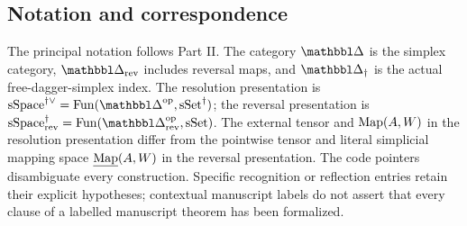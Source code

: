 \subsection*{Notation and correspondence}

The principal notation follows Part II.
The category $\prism$ is the simplex category,
$\prism_{\rev}$ includes reversal maps,
and $\prism_{\dag}$ is the actual free-dagger-simplex index.
The resolution presentation is
$\sSpace^{\dag\vee}=\Fun(\prism^{\mathrm{op}},\sSet^{\dag})$;
the reversal presentation is
$\sSpace^{\dag}_{\rev}=\Fun(\prism_{\rev}^{\mathrm{op}},\sSet)$.
The external tensor and $\operatorname{Map}(A,W)$ in the resolution presentation differ from
the pointwise tensor and literal simplicial mapping space
$\underline{\operatorname{Map}}(A,W)$ in the reversal presentation.
The code pointers disambiguate every construction.
Specific recognition or reflection entries retain their explicit hypotheses;
contextual manuscript labels do not assert that every clause of a labelled
manuscript theorem has been formalized.
